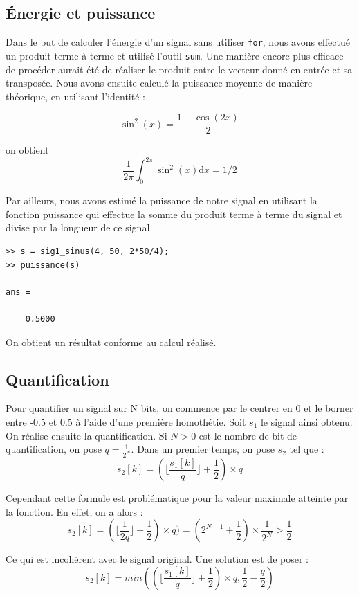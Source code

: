 \documentclass[french]{article}
\begin{document}
\subsection{ Énergie et puissance}

Dans le but de calculer l'énergie d'un signal sans utiliser \verb`for`, nous avons effectué un produit terme à terme et utilisé l'outil \verb`sum`. Une manière encore plus efficace de procéder aurait été de réaliser le produit entre le vecteur donné en entrée et sa transposée. Nous avons ensuite calculé la puissance moyenne de manière théorique, en utilisant l'identité :

\[
\sin^2(x)=\frac {1-\cos(2x)} {2}
\]

on obtient
\[
\frac{1} {2 \pi} \int_{0}^{2 \pi} \sin^2(x) \mathrm{d}x = 1/2
\]

Par ailleurs, nous avons estimé la puissance de notre signal en utilisant la fonction puissance qui effectue la somme du produit terme à terme du signal et divise par la longueur de ce signal.

\lstset{language=matlab}
\begin{lstlisting}
>> s = sig1_sinus(4, 50, 2*50/4);
>> puissance(s)

ans =

    0.5000
\end{lstlisting}

On obtient un résultat conforme au calcul réalisé.

\subsection{ Quantification}

Pour quantifier un signal sur N bits, on commence par le centrer en 0 et le borner entre -0.5 et 0.5 à l'aide d'une première homothétie. Soit $s_1$ le signal ainsi obtenu. On réalise ensuite la quantification. Si $N > 0$ est le nombre de bit de quantification, on pose $q=\frac{1}{2^N}$. Dans un premier temps, on pose $s_2$ tel que :
\[
  s_2[k] = (\lfloor \frac{s_1[k]}{q} \rfloor + \frac{1}{2}) \times q
\]

Cependant cette formule est problématique pour la valeur maximale atteinte par la fonction. En effet, on a alors :
\[
s_2[k] = ( \lfloor \frac{1}{2q} \rfloor + \frac{1}{2}) \times q ) = (2^{N-1} + \frac{1}{2}) \times \frac{1}{2^N} > \frac{1}{2}
\]

Ce qui est incohérent avec le signal original. Une solution est de poser :
\[
  s_2[k] = min((\lfloor \frac{s_1[k]}{q} \rfloor + \frac{1}{2}) \times q, \frac{1}{2} - \frac{q}{2})
\]
\end{document}

